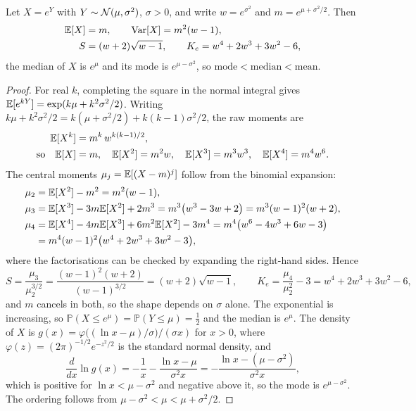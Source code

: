 \begin{chapterrefs}
\begin{proposition}\label{prop:lnmoments}
Let $X=e^Y$ with $Y\sim\mathcal{N}(\mu,\sigma^2)$, $\sigma>0$, and write $w=e^{\sigma^2}$ and $m=e^{\mu+\sigma^2/2}$. Then
\begin{align}
  \mathbb{E}[X] &= m, \qquad \operatorname{Var}[X] = m^2(w-1), \label{eq:lnmoments}\\
  S &= (w+2)\sqrt{w-1}, \qquad K_e = w^4+2w^3+3w^2-6, \label{eq:lnshape}
\end{align}
the median of $X$ is $e^\mu$ and its mode is $e^{\mu-\sigma^2}$, so $\text{mode}<\text{median}<\text{mean}$.
\end{proposition}

\begin{proof}
For real $k$, completing the square in the normal integral gives
$\mathbb{E}[e^{kY}] = \exp(k\mu + k^2\sigma^2/2)$. Writing $k\mu + k^2\sigma^2/2 = k(\mu+\sigma^2/2) + k(k-1)\sigma^2/2$,
the raw moments are
\begin{align}
  \mathbb{E}[X^k] &= m^k\,w^{k(k-1)/2}, \label{eq:lnraw}\\
  \text{so}\quad \mathbb{E}[X]&=m,\quad \mathbb{E}[X^2]=m^2w,\quad \mathbb{E}[X^3]=m^3w^3,\quad \mathbb{E}[X^4]=m^4w^6 . \nonumber
\end{align}
The central moments $\mu_j=\mathbb{E}[(X-m)^j]$ follow from the binomial expansion:
\begin{align*}
  \mu_2 &= \mathbb{E}[X^2]-m^2 = m^2(w-1),\\
  \mu_3 &= \mathbb{E}[X^3]-3m\mathbb{E}[X^2]+2m^3 = m^3\bigl(w^3-3w+2\bigr) = m^3(w-1)^2(w+2),\\
  \mu_4 &= \mathbb{E}[X^4]-4m\mathbb{E}[X^3]+6m^2\mathbb{E}[X^2]-3m^4 = m^4\bigl(w^6-4w^3+6w-3\bigr)\\
        &= m^4(w-1)^2\bigl(w^4+2w^3+3w^2-3\bigr),
\end{align*}
where the factorisations can be checked by expanding the right-hand sides. Hence
\begin{equation*}
  S = \frac{\mu_3}{\mu_2^{3/2}} = \frac{(w-1)^2(w+2)}{(w-1)^{3/2}} = (w+2)\sqrt{w-1},
  \qquad
  K_e = \frac{\mu_4}{\mu_2^{2}} - 3 = w^4+2w^3+3w^2-6 ,
\end{equation*}
and $m$ cancels in both, so the shape depends on $\sigma$ alone. The exponential is increasing, so
$\mathbb P(X\le e^\mu)=\mathbb P(Y\le\mu)=\tfrac12$ and the median is $e^\mu$. The density of $X$ is
$g(x) = \varphi\bigl((\ln x-\mu)/\sigma\bigr)/(\sigma x)$ for $x>0$, where
$\varphi(z)=(2\pi)^{-1/2}e^{-z^2/2}$ is the standard normal density, and
\begin{equation*}
  \frac{d}{dx}\ln g(x) = -\frac{1}{x} - \frac{\ln x-\mu}{\sigma^2 x} = -\frac{\ln x-(\mu-\sigma^2)}{\sigma^2 x},
\end{equation*}
which is positive for $\ln x<\mu-\sigma^2$ and negative above it, so the mode is $e^{\mu-\sigma^2}$. The
ordering follows from $\mu-\sigma^2<\mu<\mu+\sigma^2/2$.
\end{proof}


\end{chapterrefs}
